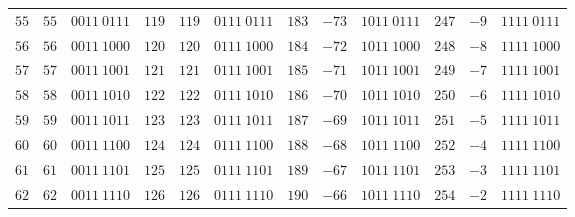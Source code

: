 \begin{center}
\begin{minipage}{0.5\linewidth}
\begin{center}
\begin{tabular}{|c|c|c||c|c|c||c|c|c||c|c|c|}
            \textcolor{numColor}{$55$} & \textcolor{twoColor}{$55$} & $0011~0111$ & \textcolor{numColor}{$119$} & \textcolor{twoColor}{$119$} & $0111~0111$ & \textcolor{numColor}{$183$} & \textcolor{twoColor}{$-73$} & $1011~0111$ & \textcolor{numColor}{$247$} & \textcolor{twoColor}{$-9$} & $1111~0111$\\ 
            \textcolor{numColor}{$56$} & \textcolor{twoColor}{$56$} & $0011~1000$ & \textcolor{numColor}{$120$} & \textcolor{twoColor}{$120$} & $0111~1000$ & \textcolor{numColor}{$184$} & \textcolor{twoColor}{$-72$} & $1011~1000$ & \textcolor{numColor}{$248$} & \textcolor{twoColor}{$-8$} & $1111~1000$\\ 
            \textcolor{numColor}{$57$} & \textcolor{twoColor}{$57$} & $0011~1001$ & \textcolor{numColor}{$121$} & \textcolor{twoColor}{$121$} & $0111~1001$ & \textcolor{numColor}{$185$} & \textcolor{twoColor}{$-71$} & $1011~1001$ & \textcolor{numColor}{$249$} & \textcolor{twoColor}{$-7$} & $1111~1001$\\ 
            \textcolor{numColor}{$58$} & \textcolor{twoColor}{$58$} & $0011~1010$ & \textcolor{numColor}{$122$} & \textcolor{twoColor}{$122$} & $0111~1010$ & \textcolor{numColor}{$186$} & \textcolor{twoColor}{$-70$} & $1011~1010$ & \textcolor{numColor}{$250$} & \textcolor{twoColor}{$-6$} & $1111~1010$\\ 
            \textcolor{numColor}{$59$} & \textcolor{twoColor}{$59$} & $0011~1011$ & \textcolor{numColor}{$123$} & \textcolor{twoColor}{$123$} & $0111~1011$ & \textcolor{numColor}{$187$} & \textcolor{twoColor}{$-69$} & $1011~1011$ & \textcolor{numColor}{$251$} & \textcolor{twoColor}{$-5$} & $1111~1011$\\ 
            \textcolor{numColor}{$60$} & \textcolor{twoColor}{$60$} & $0011~1100$ & \textcolor{numColor}{$124$} & \textcolor{twoColor}{$124$} & $0111~1100$ & \textcolor{numColor}{$188$} & \textcolor{twoColor}{$-68$} & $1011~1100$ & \textcolor{numColor}{$252$} & \textcolor{twoColor}{$-4$} & $1111~1100$\\ 
            \textcolor{numColor}{$61$} & \textcolor{twoColor}{$61$} & $0011~1101$ & \textcolor{numColor}{$125$} & \textcolor{twoColor}{$125$} & $0111~1101$ & \textcolor{numColor}{$189$} & \textcolor{twoColor}{$-67$} & $1011~1101$ & \textcolor{numColor}{$253$} & \textcolor{twoColor}{$-3$} & $1111~1101$\\ 
            \textcolor{numColor}{$62$} & \textcolor{twoColor}{$62$} & $0011~1110$ & \textcolor{numColor}{$126$} & \textcolor{twoColor}{$126$} & $0111~1110$ & \textcolor{numColor}{$190$} & \textcolor{twoColor}{$-66$} & $1011~1110$ & \textcolor{numColor}{$254$} & \textcolor{twoColor}{$-2$} & $1111~1110$\\ 

\end{tabular}
\end{center}
\end{minipage}
\end{center}
